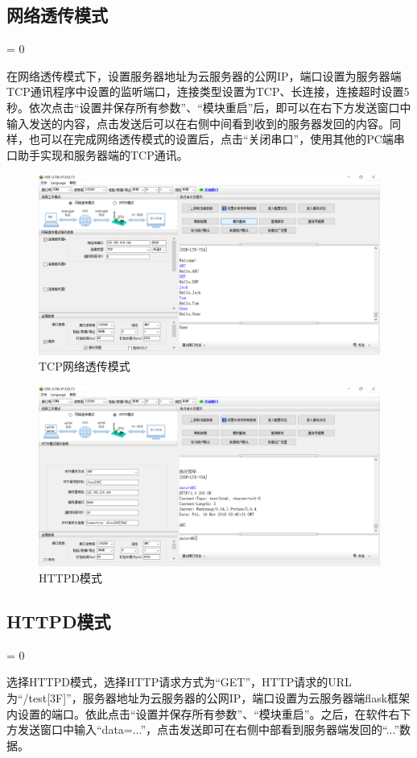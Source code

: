 \documentclass[a4paper,11pt]{ctexart}
\newcommand{\subpar}
{
	\par
	\hangafter = 0
	\setlength{\hangindent}{1em}
}
\begin{document}
\begin{spacing}{1.5}
\subsection{网络透传模式}
\subpar
在网络透传模式下，设置服务器地址为云服务器的公网IP，端口设置为服务器端TCP通讯程序中设置的监听端口，连接类型设置为TCP、长连接，连接超时设置5秒。依次点击“设置并保存所有参数”、“模块重启”后，即可以在右下方发送窗口中输入发送的内容，点击发送后可以在右侧中间看到收到的服务器发回的内容。同样，也可以在完成网络透传模式的设置后，点击“关闭串口”，使用其他的PC端串口助手实现和服务器端的TCP通讯。
\begin{figure}[h]
	\centering
	\setlength{\abovecaptionskip}{2mm}
	\setlength{\belowcaptionskip}{-2mm}
	\includegraphics[scale=0.2]{TCP.png}
	\caption{TCP网络透传模式}\label{figure:TCP}
\end{figure}
\begin{figure}[h]
	\centering
	\setlength{\abovecaptionskip}{2mm}
	\setlength{\belowcaptionskip}{-2mm}
	\includegraphics[scale=0.2]{HTTPD.png}
	\caption{HTTPD模式}\label{figure:HTTPD}
\end{figure}
\subsection{HTTPD模式}
\subpar
选择HTTPD模式，选择HTTP请求方式为“GET”，HTTP请求的URL为“/test[3F]”，服务器地址为云服务器的公网IP，端口设置为云服务器端flask框架内设置的端口。依此点击“设置并保存所有参数”、“模块重启”。之后，在软件右下方发送窗口中输入“data=...”，点击发送即可在右侧中部看到服务器端发回的“...”数据。


\end{spacing}
\end{document}
